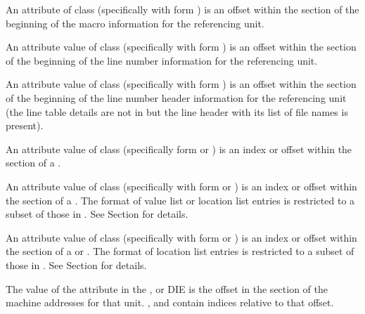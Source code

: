 \begin{description}
An attribute of class \CLASSmacptr{} (specifically \DWATmacros{}
with form \DWFORMsecoffset{}) is an offset within the
\dotdebugmacrodwo{} section of the beginning of the macro
information for the referencing unit.

An attribute value of class \CLASSlineptr{} (specifically
\DWATstmtlist{} with form \DWFORMsecoffset)
is an offset within the \dotdebugline{} section of the
beginning of the line number information for the
referencing unit.

An attribute value of class \CLASSlineptr{} (specifically
\DWATstmtlist{}  with form \DWFORMsecoffset)
is an offset within the \dotdebuglinedwo{} section of the
beginning of the line number header information
for the referencing unit (the line table details are not in
\dotdebuglinedwo{} but the line header with its list
of file names is present).

\bb
{}
An attribute value of class \CLASSrnglist{}
(specifically form \DWFORMrnglistx{} or \DWFORMsecoffset)
is an index or offset within the \dotdebugrnglists{}
section of a .
\eb

An attribute value of class \CLASSrnglist{} (specifically
\DWATranges{} with form \DWFORMrnglistx{} or \DWFORMsecoffset)
is an index or offset within the \dotdebugrnglistsdwo{}
section of a .
The format of \dotdebugrnglistsdwo{}
\bb
value list or
\eb
location list entries
is restricted to a subset of those in \dotdebugrnglists.
See Section  for details.

An attribute value of class
\CLASSloclist{} (specifically with form \DWFORMloclistx{}
or \DWFORMsecoffset)
is an index or offset within the \dotdebugloclistsdwo{}
section of a
\bb
{} or
\eb
{}.
The format of \dotdebugloclistsdwo{} location list entries
is restricted to a subset of those in \dotdebugloclists.
See Section  for details.

The value of the \DWATaddrbase{} attribute in the
\DWTAGcompileunit, \DWTAGpartialunit{} or \DWTAGtypeunit{} DIE
is the offset in the \dotdebugaddr{} section of the machine
addresses for that unit.
\DWFORMaddrxXN, \DWOPaddrx{} and \DWOPconstx{} contain indices
relative to that offset.


\end{description}

